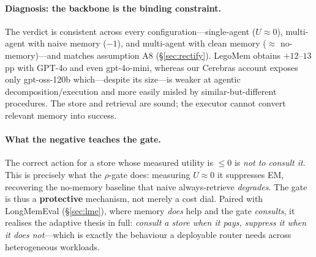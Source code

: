 \documentclass[10pt,twocolumn]{article}
\begin{document}
\begin{table}[htbp]
\centering\small
{}
\caption{Multi-agent OfficeBench (stratified train sample, gpt-oss-120b). Curated EM does
not beat no-memory; naive retrieval actively hurts, and even corrected injection only
reaches parity---no configuration yields a memory-only win.}
\label{tab:ma}
\end{table}

\paragraph{Diagnosis: the backbone is the binding constraint.} The verdict is consistent
across every configuration---single-agent ($U\approx0$), multi-agent with naive memory
($-1$), and multi-agent with clean memory ($\approx$ no-memory)---and matches assumption
A8 (\S\ref{sec:rectify}). LegoMem obtains $+12$--$13$pp with GPT-4o and even gpt-4o-mini,
whereas our Cerebras account exposes only gpt-oss-120b which---despite its size---is
weaker at agentic decomposition/execution and more easily misled by similar-but-different
procedures. The store and retrieval are sound; the executor cannot convert relevant
memory into success.

\paragraph{What the negative teaches the gate.} The correct action for a store whose
measured utility is $\le 0$ is \emph{not to consult it}. This is precisely what the
$\rho$-gate does: measuring $U\approx0$ it suppresses EM, recovering the no-memory
baseline that naive always-retrieve \emph{degrades}. The gate is thus a \textbf{protective}
mechanism, not merely a cost dial. Paired with LongMemEval (\S\ref{sec:lme}), where memory
\emph{does} help and the gate \emph{consults}, it realises the adaptive thesis in full:
\emph{consult a store when it pays, suppress it when it does not}---which is exactly the
behaviour a deployable router needs across heterogeneous workloads.
\end{document}
